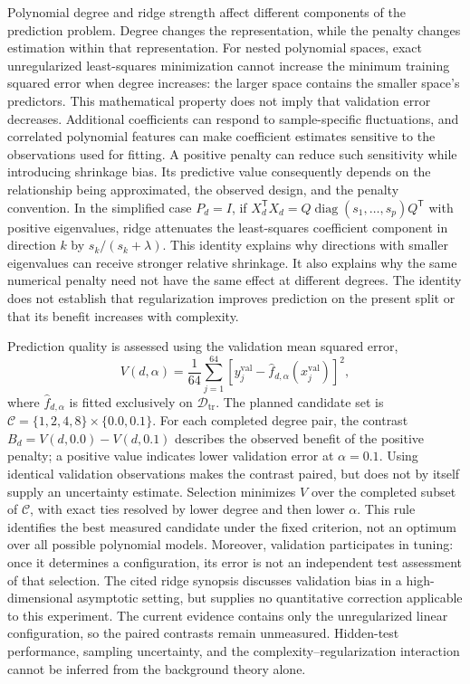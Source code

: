 \documentclass[11pt]{article}
\begin{document}
Polynomial degree and ridge strength affect different components of the prediction problem. Degree changes the representation, while the penalty changes estimation within that representation. For nested polynomial spaces, exact unregularized least-squares minimization cannot increase the minimum training squared error when degree increases: the larger space contains the smaller space's predictors. This mathematical property does not imply that validation error decreases. Additional coefficients can respond to sample-specific fluctuations, and correlated polynomial features can make coefficient estimates sensitive to the observations used for fitting. A positive penalty can reduce such sensitivity while introducing shrinkage bias. Its predictive value consequently depends on the relationship being approximated, the observed design, and the penalty convention. In the simplified case \(P_d=I\), if \(X_d^{\mathsf T}X_d=Q\operatorname{diag}(s_1,\ldots,s_p)Q^{\mathsf T}\) with positive eigenvalues, ridge attenuates the least-squares coefficient component in direction \(k\) by \(s_k/(s_k+\lambda)\). This identity explains why directions with smaller eigenvalues can receive stronger relative shrinkage. It also explains why the same numerical penalty need not have the same effect at different degrees. The identity does not establish that regularization improves prediction on the present split or that its benefit increases with complexity.

Prediction quality is assessed using the validation mean squared error,
\[
V(d,\alpha)
=
\frac{1}{64}\sum_{j=1}^{64}
\left[
y_j^{\mathrm{val}}
-\widehat f_{d,\alpha}(x_j^{\mathrm{val}})
\right]^2,
\]
where \(\widehat f_{d,\alpha}\) is fitted exclusively on \(\mathcal{D}_{\mathrm{tr}}\). The planned candidate set is \(\mathcal{C}=\{1,2,4,8\}\times\{0.0,0.1\}\). For each completed degree pair, the contrast \(B_d=V(d,0.0)-V(d,0.1)\) describes the observed benefit of the positive penalty; a positive value indicates lower validation error at \(\alpha=0.1\). Using identical validation observations makes the contrast paired, but does not by itself supply an uncertainty estimate. Selection minimizes \(V\) over the completed subset of \(\mathcal{C}\), with exact ties resolved by lower degree and then lower \(\alpha\). This rule identifies the best measured candidate under the fixed criterion, not an optimum over all possible polynomial models. Moreover, validation participates in tuning: once it determines a configuration, its error is not an independent test assessment of that selection. The cited ridge synopsis discusses validation bias in a high-dimensional asymptotic setting, but supplies no quantitative correction applicable to this experiment. The current evidence contains only the unregularized linear configuration, so the paired contrasts remain unmeasured. Hidden-test performance, sampling uncertainty, and the complexity--regularization interaction cannot be inferred from the background theory alone.
\end{document}
